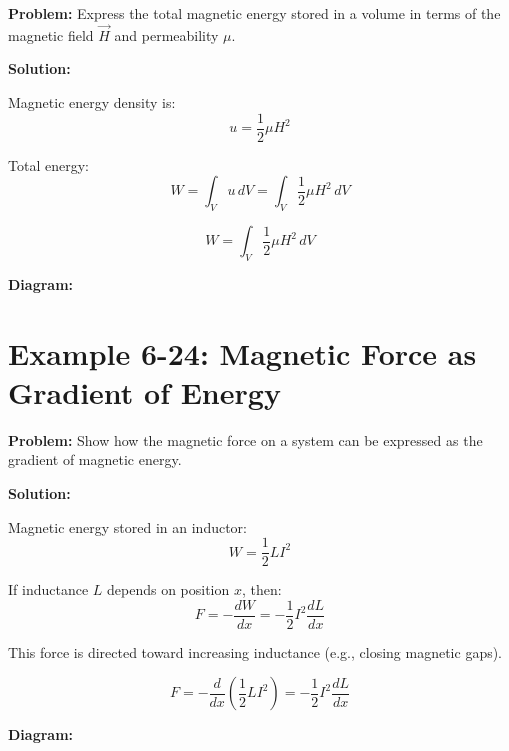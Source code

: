 \documentclass[12pt]{article}
\begin{document}
\textbf{Problem:}  
Express the total magnetic energy stored in a volume in terms of the magnetic field \( \vec{H} \) and permeability \( \mu \).

\textbf{Solution:}

Magnetic energy density is:
\[
u = \frac{1}{2} \mu H^2
\]

Total energy:
\[
W = \int_V u \, dV = \int_V \frac{1}{2} \mu H^2 \, dV
\]

\begin{tcolorbox}
\[
\boxed{W = \int_V \frac{1}{2} \mu H^2 \, dV}
\]
\end{tcolorbox}

\textbf{Diagram:}
\begin{center}
\end{center}



\section*{Example 6-24: Magnetic Force as Gradient of Energy}

\textbf{Problem:}  
Show how the magnetic force on a system can be expressed as the gradient of magnetic energy.

\textbf{Solution:}

Magnetic energy stored in an inductor:
\[
W = \frac{1}{2} L I^2
\]

If inductance \( L \) depends on position \( x \), then:
\[
F = -\frac{dW}{dx} = -\frac{1}{2} I^2 \frac{dL}{dx}
\]

This force is directed toward increasing inductance (e.g., closing magnetic gaps).

\begin{tcolorbox}
\[
\boxed{F = -\frac{d}{dx} \left( \frac{1}{2} L I^2 \right) = -\frac{1}{2} I^2 \frac{dL}{dx}}
\]
\end{tcolorbox}

\textbf{Diagram:}
\begin{center}
\end{center}
\end{document}
